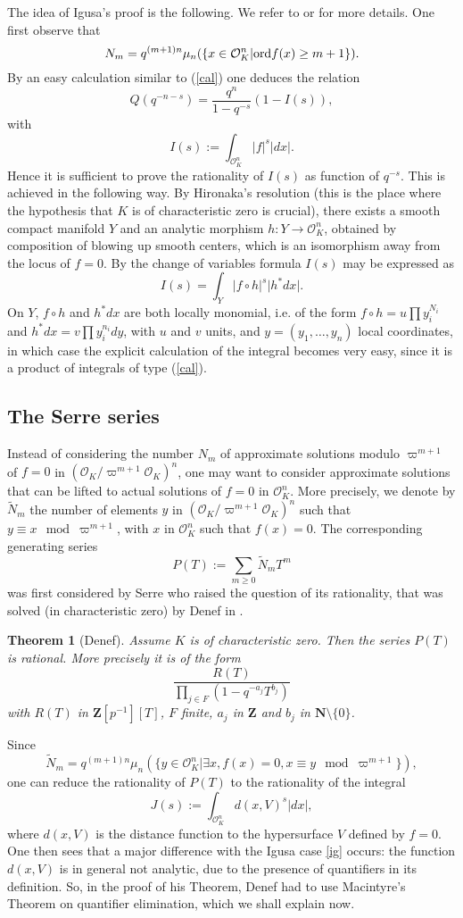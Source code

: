 \documentclass[english,12pt]{amsart}
\def\NN{{\mathbf N}}
\def\ZZ{{\mathbf Z}}
\def\cO{{\mathcal O}}
\newtheorem{theorem}[subsubsection]{Theorem}
\theoremstyle{definition}
\theoremstyle{remark}
\theoremstyle{plain}
\numberwithin{equation}{subsection}
\def\NN{{\mathbf N}}
\def\ZZ{{\mathbf Z}}
\def\cO{{\mathcal O}}
\def\ord{{\rm ord}}
\begin{document}
The idea of Igusa's proof is the following. We  refer to \cite{igusa} or
\cite{igusabook} for more details.
One first observe
that $$N_m = q^{(m + 1)n}\mu_n (\{ x \in \cO_K^n \vert \ord f (x) \geq m + 1\}).$$
By an easy  calculation similar to (\ref{cal})
one deduces
the relation
$$
Q (q^{-n -s}) = \frac{q^n}{1 - q^{-s}}(1 - I (s)),
$$
with
$$I (s) :=
\int_{\cO_K^n} \vert f \vert^s \vert dx \vert.$$
Hence it is sufficient to prove the rationality
of $I (s)$ as function of $q^{-s}$.
This is achieved in the following way. By Hironaka's resolution (this is the place
where the hypothesis that $K$ is of characteristic zero is crucial),
there exists a smooth compact manifold $Y$
and an analytic
morphism $h : Y \rightarrow \cO_K^n$,  obtained by composition of
blowing up smooth centers, which is an isomorphism away from
the locus of $f = 0$.
By the change of variables formula
$I(s)$ may be expressed
as 
$$
I (s)
=
\int_Y \vert f  \circ h \vert^s \vert h^* dx \vert.
$$
On $Y$,  $f  \circ h$ and $h^* dx$ are both locally monomial,
i.e. of the form $f  \circ h = u \prod y_i^{N_i}$
and
$h^* dx = v \prod y_i^{n_i} dy$,
with $u$ and $v$ units, and $y = (y_1, \dots, y_n)$
local coordinates, 
in which case the explicit calculation of the integral
becomes very easy, since it is a product of integrals of type
(\ref{cal}).

\subsection{The Serre series}Instead of
considering the number
$N_m$ of approximate solutions modulo $ \varpi^{m + 1}$
of $f = 0$ in $(\cO_K / \varpi^{m + 1} \cO_K)^n$, one may want to consider
approximate solutions that can be lifted to actual solutions of
$f = 0$ in $\cO_K^n$.
More precisely, we denote by $\tilde N_m$ the number of elements $y$
in
$(\cO_K / \varpi^{m + 1} \cO_K)^n$ such that $y \equiv  x \mod \varpi^{m + 1}$,
with $x$ in $\cO_K^n$ such that $f (x) = 0$.
The corresponding generating series 
$$P(T):= \sum_{m \geq 0}\tilde N_m T^m$$
was first considered by Serre who raised the question of
its  rationality, that was solved (in characteristic zero)
by Denef in \cite{denef}.


\begin{theorem}[Denef]\label{prat}Assume $K$ is of characteristic zero. Then the series
$P (T)$ is rational. More precisely it is of the form
$$\frac{R (T)}{\prod_{j \in F}(1 - q^{-a_j}T^{b_j})}$$
with $R (T)$ in $\ZZ [p^{-1}][T]$, $F$ finite,
$a_j$ in $\ZZ$ and $b_j$ in $\NN \setminus \{0\}$.
\end{theorem}
 Since
$$\tilde N_m =
q^{(m + 1)n}\mu_n (\{ y \in \cO_K^n \vert \exists
x, f (x) = 0, x \equiv y \mod \varpi^{m +1}\}),$$
one can reduce the rationality of $P (T)$ to the rationality
of the integral $$J (s) := \int_{\cO_K^n} d (x, V)^s \vert dx \vert,$$
where $d (x, V)$ is the distance function to
the hypersurface $V$ defined by $f = 0$.
One then sees that a major difference with the Igusa case
\ref{ig} occurs: the function 
$d (x, V)$ is in general not analytic, due to the presence of quantifiers
in its definition. So, in the proof of his Theorem, Denef had to use
Macintyre's Theorem on quantifier elimination, which we shall explain now.
\end{document}
